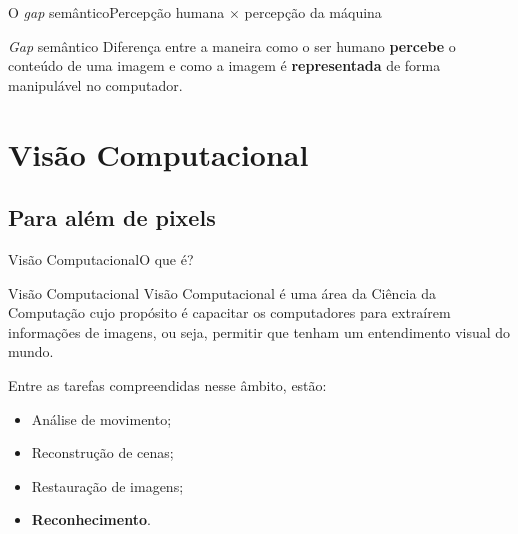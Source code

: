 \documentclass{beamer}
\begin{document}
    \begin{frame}{O \emph{gap} semântico}{Percepção humana $\times$ percepção da máquina}

        \begin{block}{\emph{Gap} semântico}
            Diferença entre a maneira como o ser humano \textbf{percebe} o conteúdo de uma imagem
            e como a imagem é \textbf{representada} de forma manipulável no computador.
        \end{block}
    
    \end{frame}

\section{Visão Computacional}

\subsection{Para além de pixels}

\begin{frame}{Visão Computacional}{O que é?}

        \begin{block}{Visão Computacional}
        Visão Computacional é uma área da Ciência da Computação
        cujo propósito é capacitar os computadores para extraírem
        informações de imagens, ou seja, permitir que tenham
        um entendimento visual do mundo.
        \end{block}

        \pause
        
        Entre as tarefas compreendidas nesse âmbito, estão:
        \begin{itemize}
            \item<3-> Análise de movimento;
            \item<4-> Reconstrução de cenas;
            \item<5-> Restauração de imagens;
            \item<6-> \textbf{Reconhecimento}.
        \end{itemize} 


    \end{frame}
\end{document}
